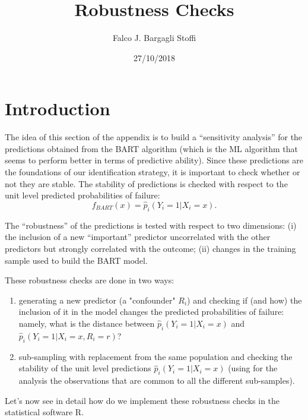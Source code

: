 \documentclass[]{article}
\title{Robustness Checks}
\author{Falco J. Bargagli Stoffi}
\date{27/10/2018}
\begin{document}
\maketitle

\hypertarget{introduction}{%
\section{Introduction}\label{introduction}}

The idea of this section of the appendix is to build a ``sensitivity
analysis'' for the predictions obtained from the BART algorithm (which
is the ML algorithm that seems to perform better in terms of predictive
ability). Since these predictions are the foundations of our
identification strategy, it is important to check whether or not they
are stable. The stability of predictions is checked with respect to the
unit level predicted probabilities of failure: \begin{equation}
 f_{BART}(x) = \hat{p}_i(Y_i = 1 | X_i = x).
\end{equation}

\par

The ``robustness'' of the predictions is tested with respect to two
dimensions: (i) the inclusion of a new ``important'' predictor
uncorrelated with the other predictors but strongly correlated with the
outcome; (ii) changes in the training sample used to build the BART
model.

These robustness checks are done in two ways:

\begin{enumerate}
  \item generating a new predictor (a "confounder" $R_i$) and checking if (and how) the inclusion of it in the model changes the predicted probabilities of failure: namely, what is the  distance between $\hat{p}_i(Y_i  = 1 | X_i = x)$ and $\hat{p}_i(Y_i = 1 | X_i = x, R_i = r)$?
  \item sub-sampling with replacement from the same population and checking the stability of the unit level predictions $\hat{p}_i(Y_i  = 1 | X_i = x)$  (using for the analysis the observations that are common to all the different sub-samples).
\end{enumerate}

\par

Let's now see in detail how do we implement these robustness checks in
the statistical software R.
\end{document}
